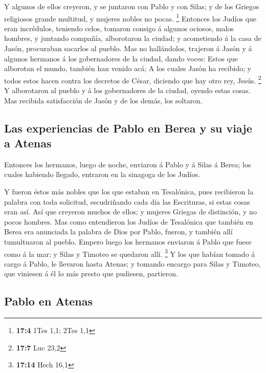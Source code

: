  Y algunos de ellos creyeron, y se juntaron con Pablo y con
Silas; y de los Griegos religiosos grande multitud, y mujeres nobles no
pocas. \footnote{\textbf{17:4} 1Tes 1,1; 2Tes 1,1}  Entonces
los Judíos que eran incrédulos, teniendo celos, tomaron consigo á
algunos ociosos, malos hombres, y juntando compañía, alborotaron la
ciudad; y acometiendo á la casa de Jasón, procuraban sacarlos al pueblo.
 Mas no hallándolos, trajeron á Jasón y á algunos hermanos á
los gobernadores de la ciudad, dando voces: Estos que alborotan el
mundo, también han venido acá;  A los cuales Jasón ha
recibido; y todos estos hacen contra los decretos de César, diciendo que
hay otro rey, Jesús. \footnote{\textbf{17:7} Luc 23,2}  Y
alborotaron al pueblo y á los gobernadores de la ciudad, oyendo estas
cosas.  Mas recibida satisfacción de Jasón y de los demás,
los soltaron.

\hypertarget{las-experiencias-de-pablo-en-berea-y-su-viaje-a-atenas}{%
\subsection{Las experiencias de Pablo en Berea y su viaje a
Atenas}\label{las-experiencias-de-pablo-en-berea-y-su-viaje-a-atenas}}

 Entonces los hermanos, luego de noche, enviaron á Pablo y
á Silas á Berea; los cuales habiendo llegado, entraron en la sinagoga de
los Judíos.

 Y fueron éstos más nobles que los que estaban en
Tesalónica, pues recibieron la palabra con toda solicitud, escudriñando
cada día las Escrituras, si estas cosas eran así.  Así que
creyeron muchos de ellos; y mujeres Griegas de distinción, y no pocos
hombres.  Mas como entendieron los Judíos de Tesalónica que
también en Berea era anunciada la palabra de Dios por Pablo, fueron, y
también allí tumultuaron al pueblo.  Empero luego los
hermanos enviaron á Pablo que fuese como á la mar; y Silas y Timoteo se
quedaron allí. \footnote{\textbf{17:14} Hech 16,1}  Y los
que habían tomado á cargo á Pablo, le llevaron hasta Atenas; y tomando
encargo para Silas y Timoteo, que viniesen á él lo más presto que
pudiesen, partieron.

\hypertarget{pablo-en-atenas}{%
\subsection{Pablo en Atenas}\label{pablo-en-atenas}}

